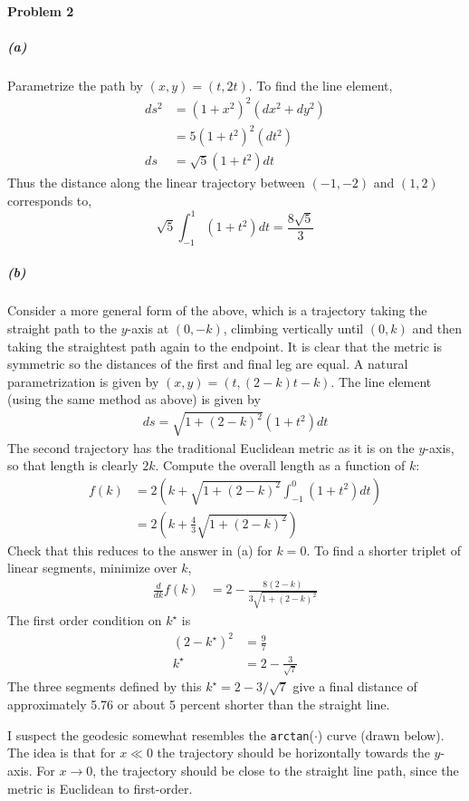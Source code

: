 \documentclass[12pt]{scrartcl}
\begin{document}
\paragraph{Problem 2}
\subparagraph{(a)} Parametrize the path by $(x, y) = (t, 2t)$. To find the line element,
\begin{align*}
	ds^2 &= (1 + x^2)^2 (dx^2 + dy^2) \\
	&= 5 (1 + t^2)^2(dt^2) \\
	ds &= \sqrt{5}(1 + t^2) dt
\end{align*}
Thus the distance along the linear trajectory between $(-1, -2)$ and $(1, 2)$ corresponds to,
\[\sqrt{5}\int_{-1}^{1}(1 + t^2) dt = \frac{8\sqrt{5}}{3}\]

\subparagraph{(b)} Consider a more general form of the above, which is a trajectory taking the straight path to the $y$-axis at $(0, -k)$, climbing vertically until $(0, k)$ and then taking the straightest path again to the endpoint.  It is clear that the metric is symmetric so the distances of the first and final leg are equal. A natural parametrization is given by $(x, y) = (t, (2-k) t - k)$. The line element (using the same method as above) is given by
\begin{align*}
	ds = \sqrt{1 + (2-k)^2}(1 + t^2) dt 
\end{align*}
The second trajectory has the traditional Euclidean metric as it is on the $y$-axis, so that length is clearly $2k$. Compute the overall length as a function of $k$:
\begin{align*}
	f(k) &= 2\left(k + \sqrt{1 + (2-k)^2}\int_{-1}^{0}(1+t^2)dt\right) \\
	&= 2\left(k + \frac{4}{3}\sqrt{1 + (2-k)^2}\right)
\end{align*}
Check that this reduces to the answer in (a) for $k=0$. To find a shorter triplet of linear segments, minimize over $k$,
\begin{align*}
	\frac{d}{d k}f(k) &= 2 - \frac{8(2-k)}{3\sqrt{1 + (2-k)^2}}
\end{align*}
The first order condition on $k^{\star}$ is
\begin{align*}
	(2-k^{\star})^2 &= \frac{9}{7}\\
	k^\star &= 2 - \frac{3}{\sqrt{7}}
\end{align*}
The three segments defined by this $k^\star = 2 - 3/\sqrt{7}$ give a final distance of approximately 5.76 or about 5 percent shorter than the straight line.

I suspect the geodesic somewhat resembles the \texttt{arctan}($\cdot$) curve (drawn below).  The idea is that for $x\ll 0$ the trajectory should be horizontally towards the $y$-axis.  For $x\to 0$, the trajectory should be close to the straight line path, since the metric is Euclidean to first-order.
\newpage 
\end{document}
